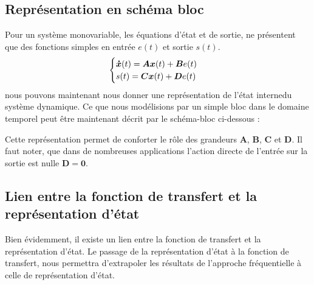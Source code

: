 \subsection{Représentation en schéma bloc}
Pour un système monovariable, les équations d'état et de sortie, ne présentent
que des fonctions simples en entrée $e(t)$ et sortie $s(t)$.
\[
\begin{cases}
    \boldsymbol{\dot{x}}(t)= \boldsymbol{A}\boldsymbol{x} (t) + \boldsymbol{B} e(t)\\
    s(t)=\boldsymbol{C} \boldsymbol{x} (t) + \boldsymbol{D} e(t)
\end{cases}
\]
nous pouvons maintenant nous donner une représentation de 
\og l'état interne\fg du système dynamique. Ce que nous 
modélisions par un simple bloc dans le domaine temporel peut être maintenant 
décrit par le schéma-bloc ci-dessous :
\begin{center}
    
\end{center}
Cette représentation permet de conforter le rôle des grandeurs $\boldsymbol{A}$,
$\boldsymbol{B}$, $\boldsymbol{C}$ et
$\boldsymbol{D}$. Il faut noter, que dans de nombreuses applications 
l'action directe de l'entrée sur la sortie est nulle $\boldsymbol{D=0}$.
\subsection{Lien entre la fonction de transfert et la représentation d'état}
Bien évidemment, il existe un lien entre la fonction de transfert et la 
représentation d'état. Le passage de la représentation d'état à la fonction
de transfert, nous permettra d'extrapoler les résultats de l'approche 
fréquentielle à celle de représentation d'état.

